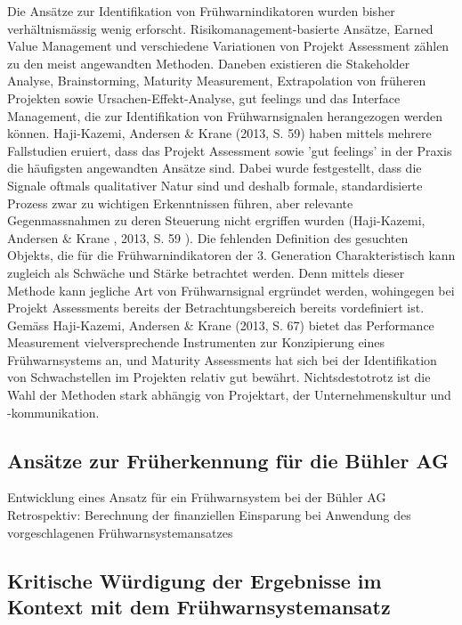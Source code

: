 \newline Die Ansätze zur Identifikation von Frühwarnindikatoren wurden bisher verhältnismässig wenig erforscht. Risikomanagement-basierte Ansätze, Earned Value Management und verschiedene Variationen von Projekt Assessment zählen zu den meist angewandten Methoden. Daneben existieren die Stakeholder Analyse, Brainstorming, Maturity Measurement, Extrapolation von früheren Projekten sowie Ursachen-Effekt-Analyse, gut feelings und das Interface Management, die zur Identifikation von Frühwarnsignalen herangezogen werden können. Haji-Kazemi, Andersen \& Krane (2013, S. 59) haben mittels mehrere Fallstudien eruiert, dass das Projekt Assessment sowie 'gut feelings' in der Praxis die häufigsten angewandten Ansätze sind. Dabei wurde festgestellt, dass die Signale oftmals qualitativer Natur sind und deshalb formale, standardisierte Prozess zwar zu wichtigen Erkenntnissen führen, aber relevante Gegenmassnahmen zu deren Steuerung nicht ergriffen wurden (Haji-Kazemi, Andersen \& Krane , 2013, S. 59 ). Die fehlenden Definition des gesuchten Objekts, die für die Frühwarnindikatoren der 3. Generation Charakteristisch kann zugleich als Schwäche und Stärke betrachtet werden. Denn mittels dieser Methode kann jegliche Art von Frühwarnsignal ergründet werden, wohingegen bei Projekt Assessments bereits der Betrachtungsbereich bereits vordefiniert ist. Gemäss Haji-Kazemi, Andersen \& Krane (2013, S. 67) bietet das Performance Measurement vielversprechende Instrumenten zur Konzipierung eines Frühwarnsystems an, und Maturity Assessments hat sich bei der Identifikation von Schwachstellen im Projekten relativ gut bewährt. Nichtsdestotrotz ist die Wahl der Methoden stark abhängig von Projektart, der Unternehmenskultur und -kommunikation.


\subsection{Ansätze zur Früherkennung für die Bühler AG}
Entwicklung eines Ansatz für ein Frühwarnsystem bei der Bühler AG
Retrospektiv: Berechnung der finanziellen Einsparung bei Anwendung des vorgeschlagenen Frühwarnsystemansatzes
\newpage
\subsection{Kritische Würdigung der Ergebnisse im Kontext mit dem Frühwarnsystemansatz}
\newpage